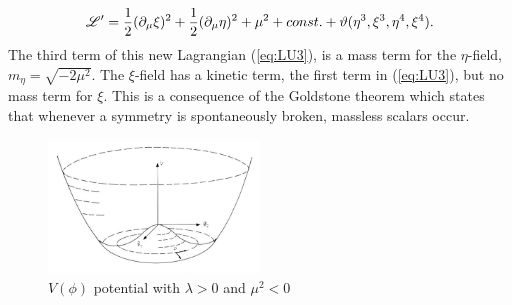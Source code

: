 \begin{equation}
\mathscr{L}'=\frac{1}{2}(\partial_{\mu}\xi)^{2}+\frac{1}{2}(\partial_{\mu}\eta)^2+\mu^{2}+const.+\vartheta(\eta^{3},\xi^{3},\eta^{4},\xi^{4}).
\label{eq:LU3}
\end{equation}
The third term of this new Lagrangian (\ref{eq:LU3}), is a mass term
for the $\eta$-field, $m_{\eta}=\sqrt{-2\mu^{2}}$. The $\xi$-field has
a kinetic term, the first term in (\ref{eq:LU3}), but no mass term
for $\xi$. This is a consequence of the Goldstone theorem which states
that whenever a symmetry is spontaneously broken, massless scalars occur.
\begin{figure}[hb]
  \centering
	\includegraphics[width=0.5\textwidth]{images/mexicanHat.jpg}
  	\caption[Potential]
   	{$V(\phi)$ potential with $\lambda>0$ and $\mu^{2}<0$}
	\label{fig:mexicanHat}
\end{figure}

